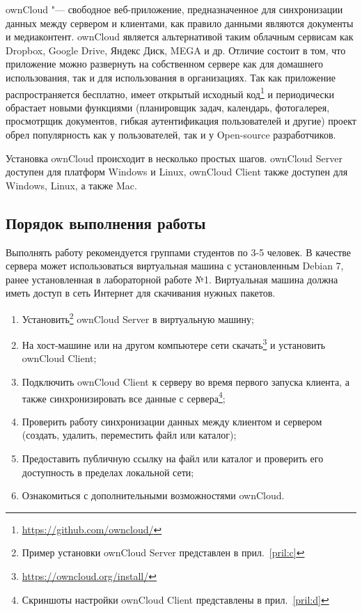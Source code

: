 ownCloud "--- свободное веб-приложение, предназначенное для синхронизации данных между сервером и клиентами, как правило данными являются документы и медиаконтент. 
ownCloud является альтернативой таким облачным сервисам как Dropbox, Google Drive, Яндекс Диск, MEGA и др.
Отличие состоит в том, что приложение можно развернуть на собственном сервере как для домашнего использования, так и для использования в организациях.
Так как приложение распространяется бесплатно, имеет открытый исходный код\footnote{\url{https://github.com/owncloud/}} и периодически обрастает новыми функциями (планировщик задач, календарь, фотогалерея, просмотрщик документов, гибкая аутентификация пользователей и другие) проект обрел популярность как у пользователей, так и у Open-source разработчиков.

Установка ownCloud происходит в несколько простых шагов.
ownCloud Server доступен для платформ Windows и Linux, ownCloud Client также доступен для Windows, Linux, а также Mac.

\subsection{Порядок выполнения работы}

Выполнять работу рекомендуется группами студентов по 3-5 человек.
В качестве сервера может использоваться виртуальная машина с установленным Debian 7, ранее установленная в лабораторной работе №1.
Виртуальная машина должна иметь доступ в сеть Интернет для скачивания нужных пакетов.

\begin{enumerate}
    \item Установить\footnote{Пример установки ownCloud Server представлен в прил.~\ref{pril:c}} ownCloud Server в виртуальную машину;
    \item На хост-машине или на другом компьютере сети скачать\footnote{\url{https://owncloud.org/install/}} и установить ownCloud Client;
    \item Подключить ownCloud Client к серверу во время первого запуска клиента, а также синхронизировать все данные с сервера\footnote{Скриншоты настройки ownCloud Client представлены в прил.~\ref{pril:d}};
    \item Проверить работу синхронизации данных между клиентом и сервером (создать, удалить, переместить файл или каталог);
    \item Предоставить публичную ссылку на файл или каталог и проверить его доступность в пределах локальной сети;
    \item Ознакомиться с дополнительными возможностями ownCloud.
\end{enumerate}

